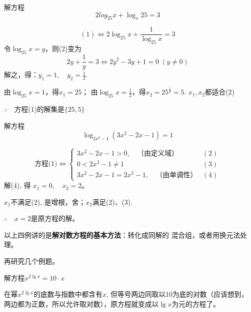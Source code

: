 \begin{example}
    解方程
    \begin{equation}
        2log_{25}x+\log_x 25=3 \tag{1}
    \end{equation}
\end{example}

\begin{solution}
\begin{equation}
    (1)\Longleftrightarrow 2\log_{25}x+\frac{1}{\log_{25}x}=3 \tag{2}
\end{equation}
令$\log_{25}x=y$，则(2)变为
\[2y+\frac{1}{y}=3\Longleftrightarrow 2y^2-3y+1=0\; (y\ne 0)\]
解之，得：$y_1=1,\quad y_2=\frac{1}{2}$.

由$\log_{25}x=1$，得$x_1=25$；
由$\log_{25}x=\frac{1}{2}$，得$x_2=25^{\tfrac{1}{2}}=5$. $x_1,x_2$都适合(2)

$\therefore\quad $方程(1)的解集是$\{25,5\}$
\end{solution}


\begin{example}
    解方程
\begin{equation}
    \log_{2x^2-1}(3x^{2}-2x-1)=1 \tag{1}
\end{equation}
\end{example}

\begin{solution}
\[\text{方程(1)}\Longleftrightarrow \begin{cases}
    3x^{2}-2x-1>0,\quad \text{（由定义域）}& (2)\\
    0<2x^2-1\ne 1 & (3)\\
    3x^{2}-2x-1=2x^2-1 ,\quad \text{（由单调性）}& (4)
\end{cases}\]
解(4), 得 $x_1=0,\quad x_2=2$。

$x_1$不满足(2), 是增根，舍；$x_2$满足(2)、(3).

$\therefore \quad x= 2$是原方程的解。
\end{solution}

以上四例讲的是\textbf{解对数方程的基本方法}：转化成同解的
混合组，或者用换元法处理。

再研究几个例题。

\begin{example}
    解方程$x^{2\lg x}=10\cdot  x$
\end{example}

\begin{analyze}
    在幂$x^{2\lg x}$的底数与指数中都含有$x$, 但等号两边同取以10为底的对数（应该想到，两边都为正数，所以允许取对数），原方程就变成以$\lg x$为元的方程了。
\end{analyze}

